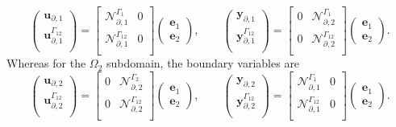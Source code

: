 \begin{equation} \label{eq:bc_Om1} 
\begin{pmatrix}
\bm{u}_{\partial, 1}\\
\bm{u}_{\partial, 1}^{\Gamma_{12}}\\
\end{pmatrix} = \begin{bmatrix}
\mathcal{N}_{\partial, 1}^{\Gamma_1} & 0\\
\mathcal{N}_{\partial, 1}^{\Gamma_{12}} & 0 \\
\end{bmatrix} \begin{pmatrix}
\bm{e}_1 \\ \bm{e}_2
\end{pmatrix}, \qquad
\begin{pmatrix}
\bm{y}_{\partial, 1}\\
\bm{y}_{\partial, 1}^{\Gamma_{12}} \\
\end{pmatrix} = \begin{bmatrix}
0 & \mathcal{N}_{\partial, 2}^{\Gamma_1} \\
0 & \mathcal{N}_{\partial, 2}^{\Gamma_{12}} \\
\end{bmatrix} \begin{pmatrix}
\bm{e}_1 \\ \bm{e}_2
\end{pmatrix}.
\end{equation}
Whereas for the $\Omega_2$ subdomain, the boundary variables are
\begin{equation} \label{eq:bc_Om2}
\begin{pmatrix}
\bm{u}_{\partial, 2}\\
\bm{u}_{\partial, 2}^{\Gamma_{12}}\\
\end{pmatrix} = \begin{bmatrix}
0 & \mathcal{N}_{\partial, 2}^{\Gamma_2}\\
0 & \mathcal{N}_{\partial, 2}^{\Gamma_{12}} \\
\end{bmatrix} \begin{pmatrix}
\bm{e}_1 \\ \bm{e}_2
\end{pmatrix}, \qquad
\begin{pmatrix}
\bm{y}_{\partial, 2}\\
\bm{y}_{\partial, 2}^{\Gamma_{12}}\\
\end{pmatrix} = \begin{bmatrix}
\mathcal{N}_{\partial, 1}^{\Gamma_1} & 0 \\
\mathcal{N}_{\partial, 1}^{\Gamma_{12}}  & 0 \\
\end{bmatrix} \begin{pmatrix}
\bm{e}_1 \\ \bm{e}_2
\end{pmatrix}.
\end{equation}
